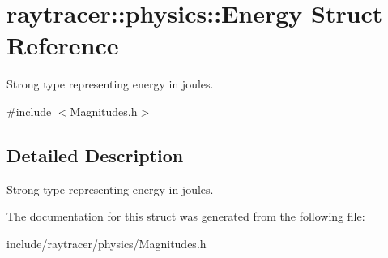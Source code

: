 \hypertarget{structraytracer_1_1physics_1_1Energy}{}\section{raytracer\+:\+:physics\+:\+:Energy Struct Reference}
\label{structraytracer_1_1physics_1_1Energy}


Strong type representing energy in joules.  




{\ttfamily \#include $<$Magnitudes.\+h$>$}



\subsection{Detailed Description}
Strong type representing energy in joules. 



The documentation for this struct was generated from the following file\+:\begin{DoxyCompactItemize}
\item 
include/raytracer/physics/Magnitudes.\+h\end{DoxyCompactItemize}

